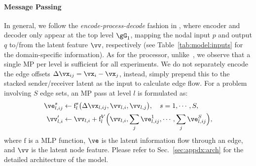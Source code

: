 \paragraph*{Message Passing} In general, we follow the \textit{encode-process-decode} fashion in \flatGNN, where encoder and decoder only appear at the top level $\gG_1$, mapping the nodal input $p$ and output $q$ to/from the latent feature $\vv$, respectively (see Table~\ref{tab:model:inputs} for the domain-specific information). As for the processor, unlike~\cite{fortunato2022multiscale}, we observe that a single MP per level is sufficient for all experiments. We do not separately encode the edge offsets $\Delta\vx_{ij}=\vx_i-\vx_j$, instead, simply prepend this to the stacked sender/receiver latent as the input to calculate edge flow. For a problem involving $S$ edge sets, an MP pass at level $l$ is formulated as:
\begin{equation}
    \label{eq:MP}
    \begin{split}
        \ve_{l,ij}^{s}&\leftarrow\text{f}^{s}_l\big(\Delta\vx_{l,ij},\vv_{l,i},\vv_{l,j}\big),\quad s=1,\cdots,S,\\
        \vv'_{l,i}&\leftarrow\vv_{l,i}+\text{f}^{V}_l\Big(\vv_{l,i},\sum_{j}\ve_{l,ij}^{1},\cdots,\sum_{j}\ve_{l,ij}^{S}\Big),
    \end{split}
\end{equation}
where $\text{f}$ is a MLP function, $\ve$ is the latent information flow through an edge, and $\vv$ is the latent node feature. Please refer to Sec.~\ref{sec:appdx:arch} for the detailed architecture of the model.
